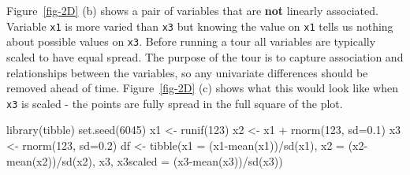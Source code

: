 \documentclass[
  letterpaper,
]{krantz}
\newenvironment{Shaded}{\begin{snugshade}}{\end{snugshade}}
\newcommand{\AttributeTok}[1]{\textcolor[rgb]{0.40,0.45,0.13}{#1}}
\newcommand{\DecValTok}[1]{\textcolor[rgb]{0.68,0.00,0.00}{#1}}
\newcommand{\FloatTok}[1]{\textcolor[rgb]{0.68,0.00,0.00}{#1}}
\newcommand{\FunctionTok}[1]{\textcolor[rgb]{0.28,0.35,0.67}{#1}}
\newcommand{\NormalTok}[1]{\textcolor[rgb]{0.00,0.23,0.31}{#1}}
\newcommand{\OtherTok}[1]{\textcolor[rgb]{0.00,0.23,0.31}{#1}}
\newcommand{\SpecialCharTok}[1]{\textcolor[rgb]{0.37,0.37,0.37}{#1}}
\begin{document}
Figure~\ref{fig-2D} (b) shows a pair of variables that are \textbf{not}
linearly associated. Variable \texttt{x1} is more varied than
\texttt{x3} but knowing the value on \texttt{x1} tells us nothing about
possible values on \texttt{x3}. Before running a tour all variables are
typically scaled to have equal spread. The purpose of the tour is to
capture association and relationships between the variables, so any
univariate differences should be removed ahead of time.
Figure~\ref{fig-2D} (c) shows what this would look like when \texttt{x3}
is scaled - the points are fully spread in the full square of the plot.

\begin{Shaded}
\begin{Highlighting}[]
\FunctionTok{library}\NormalTok{(tibble)}
\FunctionTok{set.seed}\NormalTok{(}\DecValTok{6045}\NormalTok{)}
\NormalTok{x1 }\OtherTok{\textless{}{-}} \FunctionTok{runif}\NormalTok{(}\DecValTok{123}\NormalTok{)}
\NormalTok{x2 }\OtherTok{\textless{}{-}}\NormalTok{ x1 }\SpecialCharTok{+} \FunctionTok{rnorm}\NormalTok{(}\DecValTok{123}\NormalTok{, }\AttributeTok{sd=}\FloatTok{0.1}\NormalTok{)}
\NormalTok{x3 }\OtherTok{\textless{}{-}} \FunctionTok{rnorm}\NormalTok{(}\DecValTok{123}\NormalTok{, }\AttributeTok{sd=}\FloatTok{0.2}\NormalTok{)}
\NormalTok{df }\OtherTok{\textless{}{-}} \FunctionTok{tibble}\NormalTok{(}\AttributeTok{x1 =}\NormalTok{ (x1}\SpecialCharTok{{-}}\FunctionTok{mean}\NormalTok{(x1))}\SpecialCharTok{/}\FunctionTok{sd}\NormalTok{(x1), }
             \AttributeTok{x2 =}\NormalTok{ (x2}\SpecialCharTok{{-}}\FunctionTok{mean}\NormalTok{(x2))}\SpecialCharTok{/}\FunctionTok{sd}\NormalTok{(x2),}
\NormalTok{             x3, }
             \AttributeTok{x3scaled =}\NormalTok{ (x3}\SpecialCharTok{{-}}\FunctionTok{mean}\NormalTok{(x3))}\SpecialCharTok{/}\FunctionTok{sd}\NormalTok{(x3))}
\end{Highlighting}
\end{Shaded}
\end{document}
